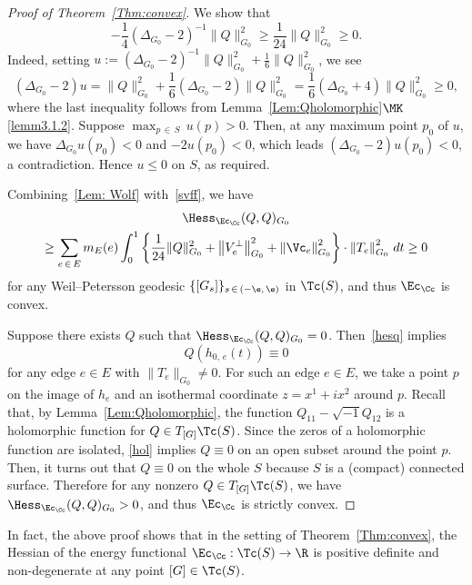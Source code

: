 \begin{proof}[{Proof of Theorem~\ref{Thm:convex}}]
We show that
\begin{equation}\label{Lem: Wolf}
-\frac{1}{4}\left(\Delta_{G_0}-2\right)^{-1}\|Q\|^2_{G_0}\geq \frac{1}{24}\|Q\|^2_{G_0}\geq 0.
\end{equation}
Indeed, setting $u:=(\Delta_{G_0}-2)^{-1}\|Q\|_{G_0}^2+\tfrac{1}{6}\|Q\|_{G_0}^2$, we see
\[
\left(\Delta_{G_0}-2\right)u=\|Q\|_{G_0}^2+\frac{1}{6}\left(\Delta_{G_0}-2\right)\|Q\|_{G_0}^2=\frac{1}{6}\left(\Delta_{G_0}+4\right)\|Q\|_{G_0}^2\geq 0,
\]
where the last inequality follows from Lemma~\ref{Lem:Qholomorphic}$\MK$\eqref{lemm3.1.2}. Suppose ${\max}_{p\,\in\,S}\,u(p)>0$. Then, at any maximum point $p_0$ of $u$, we have $\Delta_{G_0} u(p_0)<0$ and $-2u(p_0)<0$, which leads $(\Delta_{G_0}-2)u(p_0)<0$, a contradiction. Hence $u\leq 0$ on $S$, as required.



Combining~\eqref{Lem: Wolf} with~\eqref{svff}, we have
\begin{multline}\label{hesq}
\Hess_{\Ec_{\Cc}}(Q,Q)_{G_0}\\
\geq \sum_{e\,\in\,E}m_E(e)\int_0^1\left\{\frac{1}{24}\|Q\|^2_{G_0}+\left\|V_e^{\perp}\right\|_{G_0}^2+\left\|\Vc_e\right\|_{G_0}^2\right\}\cdot \left\|T_e\right\|_{G_0}^2\, dt\geq 0
\end{multline}
for any Weil--Petersson geodesic $\{[G_s]\}_{s\,\in\,(-\e,\,\e)}$ in $\Tc(S)$, and thus $\Ec_{\Cc}$ is convex.


Suppose there exists $Q$ such that $\Hess_{\Ec_{\Cc}}(Q,Q)_{G_0}=0$. Then~\eqref{hesq} implies
\begin{equation}\label{hol}
Q(h_{0,\,e}(t))\equiv 0
\end{equation}
for any edge $e\in E$ with $\|T_e\|_{G_0}\neq 0$. For such an edge $e\in E$, we take a point $p$ on the image of $h_e$ and an isothermal coordinate $z=x^1+ix^2$ around $p$. Recall that, by Lemma~\ref{Lem:Qholomorphic}, the function $Q_{11}-\sqrt{-1}Q_{12}$ is a holomorphic function for $Q\in T_{[G]}\Tc(S)$. Since the zeros of a holomorphic function are isolated, \eqref{hol} implies $Q\equiv 0$ on an open subset around the point $p$. Then, it turns out that $Q\equiv 0$ on the whole $S$ because $S$ is a (compact) connected surface. Therefore for any nonzero $Q\in T_{[G]}\Tc(S)$, we have $\Hess_{\Ec_{\Cc}}(Q,Q)_{G_0}>0$, and thus $\Ec_{\Cc}$ is strictly convex.
\end{proof}

\begin{rema}
In fact, the above proof shows that in the setting of Theorem~\ref{Thm:convex}, the Hessian of the energy functional $\Ec_{\Cc}: \Tc(S)\to \R$ is positive definite and non-degenerate at any point $[G]\in \Tc(S)$.
\end{rema}



